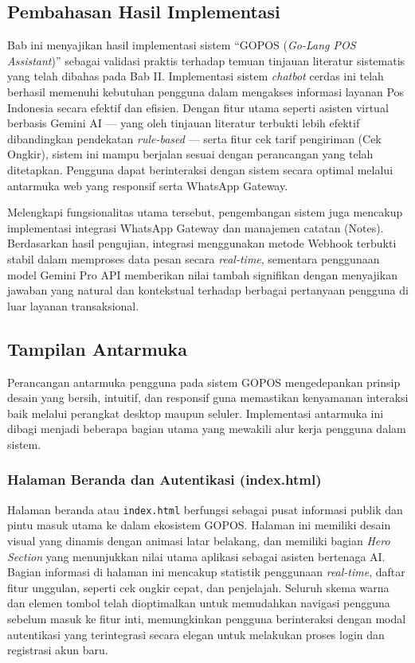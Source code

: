 
\subsection{Pembahasan Hasil Implementasi}

Bab ini menyajikan hasil implementasi sistem ``GOPOS (\textit{Go-Lang POS Assistant})'' sebagai validasi praktis terhadap temuan tinjauan literatur sistematis yang telah dibahas pada Bab II. Implementasi sistem \textit{chatbot} cerdas ini telah berhasil memenuhi kebutuhan pengguna dalam mengakses informasi layanan Pos Indonesia secara efektif dan efisien. Dengan fitur utama seperti asisten virtual berbasis Gemini AI --- yang oleh tinjauan literatur terbukti lebih efektif dibandingkan pendekatan \textit{rule-based} --- serta fitur cek tarif pengiriman (Cek Ongkir), sistem ini mampu berjalan sesuai dengan perancangan yang telah ditetapkan. Pengguna dapat berinteraksi dengan sistem secara optimal melalui antarmuka web yang responsif serta WhatsApp Gateway.

Melengkapi fungsionalitas utama tersebut, pengembangan sistem juga mencakup implementasi integrasi WhatsApp Gateway dan manajemen catatan (Notes). Berdasarkan hasil pengujian, integrasi menggunakan metode Webhook terbukti stabil dalam memproses data pesan secara \textit{real-time}, sementara penggunaan model Gemini Pro API memberikan nilai tambah signifikan dengan menyajikan jawaban yang natural dan kontekstual terhadap berbagai pertanyaan pengguna di luar layanan transaksional.

\subsection{Tampilan Antarmuka}

Perancangan antarmuka pengguna pada sistem GOPOS mengedepankan prinsip desain yang bersih, intuitif, dan responsif guna memastikan kenyamanan interaksi baik melalui perangkat desktop maupun seluler. Implementasi antarmuka ini dibagi menjadi beberapa bagian utama yang mewakili alur kerja pengguna dalam sistem.

\subsubsection{Halaman Beranda dan Autentikasi (index.html)}

Halaman beranda atau \texttt{index.html} berfungsi sebagai pusat informasi publik dan pintu masuk utama ke dalam ekosistem GOPOS. Halaman ini memiliki desain visual yang dinamis dengan animasi latar belakang, dan memiliki bagian \textit{Hero Section} yang menunjukkan nilai utama aplikasi sebagai asisten bertenaga AI. Bagian informasi di halaman ini mencakup statistik penggunaan \textit{real-time}, daftar fitur unggulan, seperti cek ongkir cepat, dan penjelajah. Seluruh skema warna dan elemen tombol telah dioptimalkan untuk memudahkan navigasi pengguna sebelum masuk ke fitur inti, memungkinkan pengguna berinteraksi dengan modal autentikasi yang terintegrasi secara elegan untuk melakukan proses login dan registrasi akun baru.


